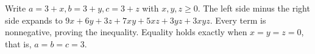 Write $a=3+x,b=3+y,c=3+z$ with $x,y,z\ge0$. The left side minus the right side expands to $9x+6y+3z+7xy+5xz+3yz+3xyz$. Every term is nonnegative, proving the inequality. Equality holds exactly when $x=y=z=0$, that is, $a=b=c=3$.
